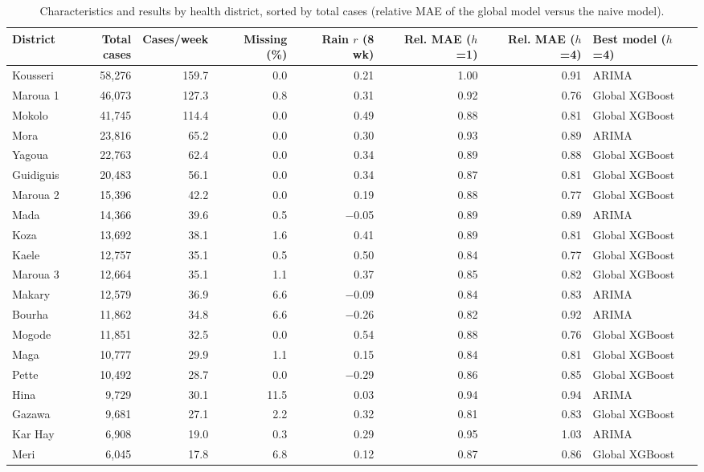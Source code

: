 \begin{table}[!htbp]\centering\scriptsize\setlength{\tabcolsep}{4pt}
\caption{Characteristics and results by health district, sorted by total cases (relative MAE of the global model versus the naive model).}\label{tab:annexe}
\begin{tabular}{@{}lrrrrrrl@{}}\toprule
District & Total cases & Cases/week & Missing (\%) & Rain $r$ (8 wk) & Rel. MAE ($h$=1) & Rel. MAE ($h$=4) & Best model ($h$=4) \\\midrule
Kousseri & 58,276 & 159.7 & 0.0 & 0.21 & 1.00 & 0.91 & ARIMA \\
Maroua 1 & 46,073 & 127.3 & 0.8 & 0.31 & 0.92 & 0.76 & Global XGBoost \\
Mokolo & 41,745 & 114.4 & 0.0 & 0.49 & 0.88 & 0.81 & Global XGBoost \\
Mora & 23,816 & 65.2 & 0.0 & 0.30 & 0.93 & 0.89 & ARIMA \\
Yagoua & 22,763 & 62.4 & 0.0 & 0.34 & 0.89 & 0.88 & Global XGBoost \\
Guidiguis & 20,483 & 56.1 & 0.0 & 0.34 & 0.87 & 0.81 & Global XGBoost \\
Maroua 2 & 15,396 & 42.2 & 0.0 & 0.19 & 0.88 & 0.77 & Global XGBoost \\
Mada & 14,366 & 39.6 & 0.5 & $-$0.05 & 0.89 & 0.89 & ARIMA \\
Koza & 13,692 & 38.1 & 1.6 & 0.41 & 0.89 & 0.81 & Global XGBoost \\
Kaele & 12,757 & 35.1 & 0.5 & 0.50 & 0.84 & 0.77 & Global XGBoost \\
Maroua 3 & 12,664 & 35.1 & 1.1 & 0.37 & 0.85 & 0.82 & Global XGBoost \\
Makary & 12,579 & 36.9 & 6.6 & $-$0.09 & 0.84 & 0.83 & ARIMA \\
Bourha & 11,862 & 34.8 & 6.6 & $-$0.26 & 0.82 & 0.92 & ARIMA \\
Mogode & 11,851 & 32.5 & 0.0 & 0.54 & 0.88 & 0.76 & Global XGBoost \\
Maga & 10,777 & 29.9 & 1.1 & 0.15 & 0.84 & 0.81 & Global XGBoost \\
Pette & 10,492 & 28.7 & 0.0 & $-$0.29 & 0.86 & 0.85 & Global XGBoost \\
Hina & 9,729 & 30.1 & 11.5 & 0.03 & 0.94 & 0.94 & ARIMA \\
Gazawa & 9,681 & 27.1 & 2.2 & 0.32 & 0.81 & 0.83 & Global XGBoost \\
Kar Hay & 6,908 & 19.0 & 0.3 & 0.29 & 0.95 & 1.03 & ARIMA \\
Meri & 6,045 & 17.8 & 6.8 & 0.12 & 0.87 & 0.86 & Global XGBoost \\

\end{tabular}
\end{table}
